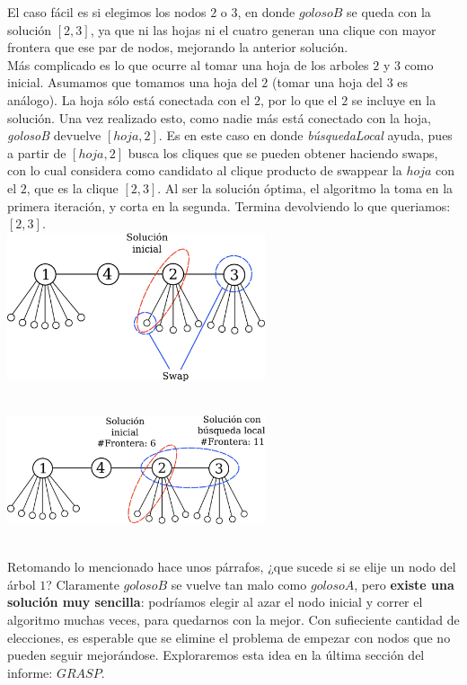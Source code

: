 El caso fácil es si elegimos los nodos $2$ o $3$, en donde $golosoB$ se queda con la solución $[2,3]$, ya que ni las hojas ni el cuatro generan una clique con mayor frontera que ese par de nodos, mejorando la anterior solución. \\

Más complicado es lo que ocurre al tomar una hoja de los arboles $2$ y $3$ como inicial. Asumamos que tomamos una hoja del $2$ (tomar una hoja del $3$ es análogo). La hoja sólo está conectada con el $2$, por lo que el $2$ se incluye en la solución. Una vez realizado esto, como nadie más está conectado con la hoja, \textit{golosoB} devuelve $[hoja,2]$. Es en este caso en donde \textit{búsquedaLocal} ayuda, pues a partir de $[hoja,2]$ busca los cliques que se pueden obtener haciendo swaps, con lo cual considera como candidato al clique producto de swappear la $hoja$ con el $2$, que es la clique $[2,3]$. Al ser la solución óptima, el algoritmo la toma en la primera iteración, y corta en la segunda. Termina devolviendo lo que queriamos: $[2,3]$. \\

{\centering
    \includegraphics[width=0.57\textwidth]{informe/imgs/local_base_nodes_v2.png} \\
}
$ $\newline

{\centering
    \includegraphics[width=0.57\textwidth]{informe/imgs/local_base_nodes_v3.png} \\
}
$ $\newline

Retomando lo mencionado hace unos párrafos, ¿que sucede si se elije un nodo del árbol $1$? Claramente $golosoB$ se vuelve tan malo como $golosoA$, pero \textbf{existe una solución muy sencilla}: podríamos elegir al azar el nodo inicial y correr el algoritmo muchas veces, para quedarnos con la mejor. Con sufieciente cantidad de elecciones, es esperable que se elimine el problema de empezar con nodos que no pueden seguir mejorándose. Exploraremos esta idea en la última sección del informe: $GRASP$.

